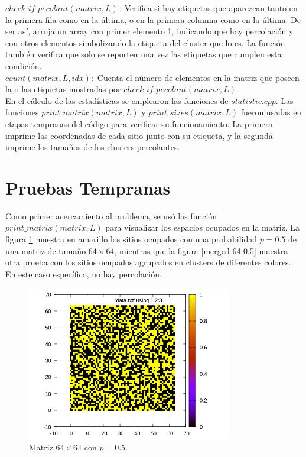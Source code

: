 \documentclass[10pt,twocolumn]{article}
\begin{document}
    $check\_if\_pecolant(matrix, L):$ Verifica si hay etiquetas que aparezcan tanto en la primera fila como en la última, o
    en la primera columna como en la última. De ser así, arroja un array con primer elemento 1, indicando que hay percolación y con otros elementos simbolizando la etiqueta del cluster que lo es. La función también verifica que solo se reporten una vez las etiquetas que cumplen esta condición.\\
    
    $count(matrix, L, idx):$ Cuenta el número de elementos en la matriz que poseen la o las etiquetas mostradas por
    $check\_if\_pecolant(matrix, L)$.\\

    En el cálculo de las estadísticas se emplearon las funciones de $statistic.cpp$. Las funciones $print\_matrix(matrix, L)$
    y $print\_sizes(matrix, L)$ fueron usadas en etapas tempranas del código para verificar su funcionamiento. La primera 
    imprime las coordenadas de cada sitio junto con su etiqueta, y la segunda imprime los tamaños de los clusters
    percolantes.

\section{Pruebas Tempranas}
    Como primer acercamiento al problema, se usó las función $print\_matrix(matrix, L)$ para visualizar los espacios ocupados
    en la matriz. La figura \ref{64 0.5} muestra en amarillo los sitios ocupados con una probabilidad $p = 0.5$ de una matriz
    de tamaño $64\times 64$, mientras que la figura \ref{merged 64 0.5} muestra otra prueba con los sitios ocupados agrupados
    en clusters de diferentes colores. En este caso específico, no hay percolación. 
   \begin{figure}[htbp]
    \centering
    \includegraphics[width=9cm]{./data/64 0.5.png}
    \caption{Matriz $64\times 64$ con $p = 0.5$.}
    \label{64 0.5} 
   \end{figure} 
\end{document}
